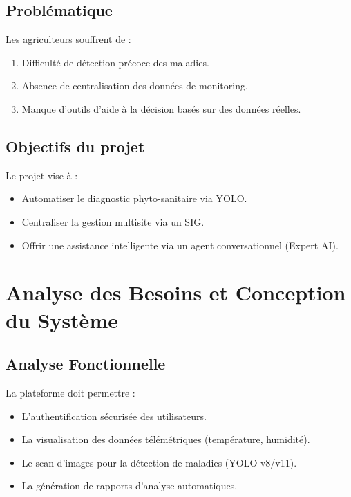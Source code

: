 \documentclass[12pt,a4paper,oneside]{report}
\begin{document}
\section{Problématique}
Les agriculteurs souffrent de :
\begin{enumerate}
    \item Difficulté de détection précoce des maladies.
    \item Absence de centralisation des données de monitoring.
    \item Manque d'outils d'aide à la décision basés sur des données réelles.
\end{enumerate}

\section{Objectifs du projet}
Le projet vise à :
\begin{itemize}
    \item Automatiser le diagnostic phyto-sanitaire via YOLO.
    \item Centraliser la gestion multisite via un SIG.
    \item Offrir une assistance intelligente via un agent conversationnel (Expert AI).
\end{itemize}

\chapter{Analyse des Besoins et Conception du Système}

\section{Analyse Fonctionnelle}
La plateforme doit permettre :
\begin{itemize}
    \item L'authentification sécurisée des utilisateurs.
    \item La visualisation des données télémétriques (température, humidité).
    \item Le scan d'images pour la détection de maladies (YOLO v8/v11).
    \item La génération de rapports d'analyse automatiques.
\end{itemize}
\end{document}
